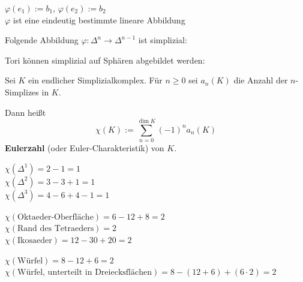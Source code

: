 \begin{beispiel}
    \begin{bspenum}
        \item $\varphi(e_1) := b_1$, $\varphi(e_2) := b_2$\\
              $\varphi$ ist eine eindeutig bestimmte lineare Abbildung

              

        \item Folgende Abbildung $\varphi: \Delta^n \rightarrow \Delta^{n-1}$ 
              ist simplizial:

              
        \item Tori können simplizial auf Sphären abgebildet werden:

            \resizebox{0.9\linewidth}{!}{}
    \end{bspenum}
\end{beispiel}

\begin{definition}%
    Sei $K$ ein endlicher Simplizialkomplex. Für $n \geq 0$ sei
    $a_n(K)$ die Anzahl der $n$-Simplizes in $K$.

    Dann heißt 
    \[\chi(K) := \sum_{n=0}^{\dim K} (-1)^n a_n(K)\]
    \textbf{Eulerzahl} (oder Euler-Charakteristik)
    von $K$.
\end{definition}

\begin{beispiel}
    \begin{bspenum}
        \item $\chi(\Delta^1) = 2 - 1 = 1$\\
              $\chi(\Delta^2) = 3 - 3 + 1 = 1$\\
              $\chi(\Delta^3) = 4 - 6 + 4 - 1 = 1$
        \item $\chi(\text{Oktaeder-Oberfläche}) = 6 - 12 + 8 = 2$\\
              $\chi(\text{Rand des Tetraeders}) = 2$\\
              $\chi(\text{Ikosaeder}) = 12 - 30 + 20 = 2$
        \item $\chi(\text{Würfel}) = 8 - 12 + 6 = 2$\\
              $\chi(\text{Würfel, unterteilt in Dreiecksflächen}) = 8 - (12 + 6) + (6 \cdot 2) = 2$
    \end{bspenum}
\end{beispiel}

